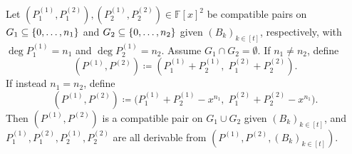 \begin{lemma}
    Let $(P^{(1)}_1, P^{(2)}_1), (P^{(1)}_2, P^{(2)}_2) \in \mathbb{F}[x]^2$ be compatible pairs on $G_1 \subseteq \{0,\dotsc,n_1\}$ and $G_2 \subseteq \{0,\dotsc,n_2\}$ given $(B_k)_{k \in [t]}$, respectively, with $\deg P^{(1)}_1 = n_1$ and $\deg P^{(1)}_2 = n_2$.
    Assume $G_1 \cap G_2 = \emptyset$. If $n_1 \ne n_2$, define
    \[
        (P^{(1)},P^{(2)}) \coloneqq (P^{(1)}_1 + P^{(1)}_2,\; P^{(2)}_1 + P^{(2)}_2).
    \]
    If instead $n_1 = n_2$, define
    \[
        (P^{(1)},P^{(2)}) \coloneqq \bigl(P^{(1)}_1 + P^{(1)}_2 - x^{n_1},\; P^{(2)}_1 + P^{(2)}_2 - x^{n_1}\bigr).
    \]
    Then $(P^{(1)}, P^{(2)})$ is a compatible pair on $G_1 \cup G_2$ given $(B_k)_{k \in [t]}$, and $P^{(1)}_1, P^{(2)}_1, P^{(1)}_2, P^{(2)}_2$ are all derivable from $(P^{(1)}, P^{(2)}, (B_k)_{k \in [t]})$.
\end{lemma}
